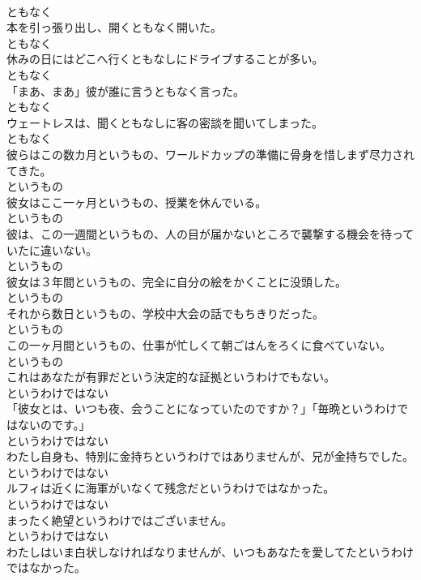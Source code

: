 \documentclass[8pt]{extreport}
\begin{document}
\begin{CJK}{UTF8}{min}
\\	ともなく
\\	本を引っ張り出し、開くともなく開いた。	
\\	ともなく
\\	休みの日にはどこへ行くともなしにドライブすることが多い。	
\\	ともなく
\\	「まあ、まあ」彼が誰に言うともなく言った。	
\\	ともなく
\\	ウェートレスは、聞くともなしに客の密談を聞いてしまった。	
\\	ともなく
\\	彼らはこの数カ月というもの、ワールドカップの準備に骨身を惜しまず尽力されてきた。	
\\	というもの
\\	彼女はここ一ヶ月というもの、授業を休んでいる。	
\\	というもの
\\	彼は、この一週間というもの、人の目が届かないところで襲撃する機会を待っていたに違いない。	
\\	というもの
\\	彼女は３年間というもの、完全に自分の絵をかくことに没頭した。	
\\	というもの
\\	それから数日というもの、学校中大会の話でもちきりだった。	
\\	というもの
\\	この一ヶ月間というもの、仕事が忙しくて朝ごはんをろくに食べていない。	
\\	というもの
\\	これはあなたが有罪だという決定的な証拠というわけでもない。	
\\	というわけではない
\\	「彼女とは、いつも夜、会うことになっていたのですか？」「毎晩というわけではないのです。」	
\\	というわけではない
\\	わたし自身も、特別に金持ちというわけではありませんが、兄が金持ちでした。	
\\	というわけではない
\\	ルフィは近くに海軍がいなくて残念だというわけではなかった。	
\\	というわけではない
\\	まったく絶望というわけではございません。	
\\	というわけではない
\\	わたしはいま白状しなければなりませんが、いつもあなたを愛してたというわけではなかった。	

\end{CJK}
\end{document}
